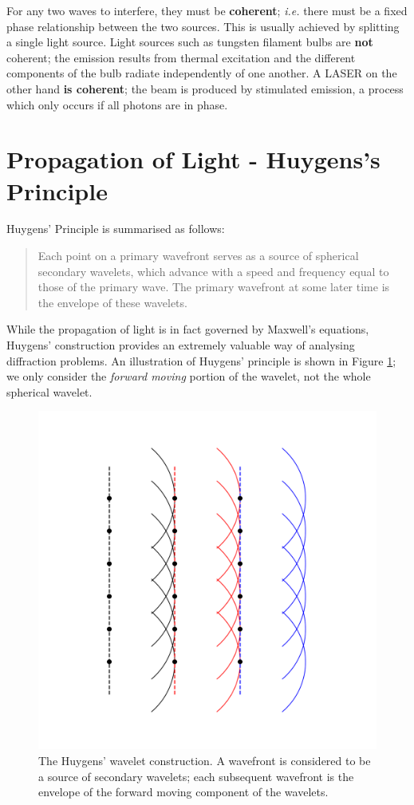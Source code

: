 \documentclass[
]{book}
\begin{document}
For any two waves to interfere, they must be \textbf{coherent}; \emph{i.e.} there must be a fixed phase relationship between the two sources. This is usually achieved by splitting a single light source. Light sources such as tungsten filament bulbs are \textbf{not} coherent; the emission results from thermal excitation and the different components of the bulb radiate independently of one another. A LASER on the other hand \textbf{is coherent}; the beam is produced by stimulated emission, a process which only occurs if all photons are in phase.

\hypertarget{sec:ch13-lightpropagation}{%
\section{Propagation of Light - Huygens's Principle}\label{sec:ch13-lightpropagation}}

Huygens' Principle is summarised as follows:

\begin{quote}
Each point on a primary wavefront serves as a source of spherical secondary wavelets, which advance with a speed and frequency equal to those of the primary wave. The primary wavefront at some later time is the envelope of these wavelets.
\end{quote}

While the propagation of light is in fact governed by Maxwell's equations, Huygens' construction provides an extremely valuable way of analysing diffraction problems. An illustration of Huygens' principle is shown in Figure \ref{fig:ch13-huygenswavelets1}; we only consider the \emph{forward moving} portion of the wavelet, not the whole spherical wavelet.

\begin{figure}

{\centering \includegraphics[width=0.7\linewidth]{visualisations/ch13-huygenswavelets1} 

}

\caption{The Huygens' wavelet construction. A wavefront is considered to be a source of secondary wavelets; each subsequent wavefront is the envelope of the forward moving component of the wavelets.}\label{fig:ch13-huygenswavelets1}
\end{figure}
\end{document}

